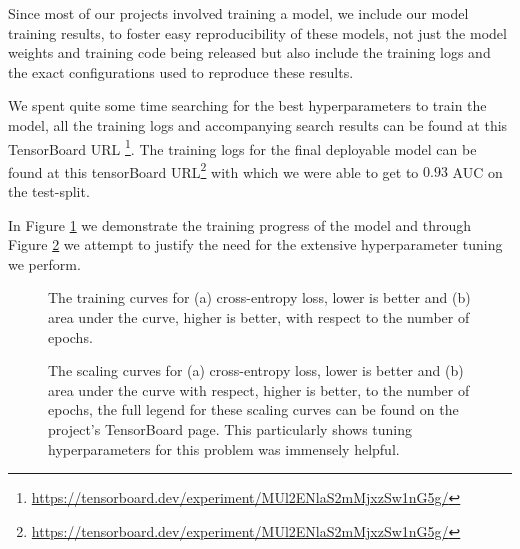 \documentclass[fontsize=11pt]{article}
\begin{document}
Since most of our projects involved training a model, we include our model training results, to foster easy reproducibility of these models, not just the model weights and training code being released but also include the training logs and the exact configurations used to reproduce these results.

We spent quite some time searching for the best hyperparameters to train the model, all the training logs and accompanying search results can be found at 
 this TensorBoard URL \footnote{\url{https://tensorboard.dev/experiment/MUl2ENlaS2mMjxzSw1nG5g/}}. The training logs for the final deployable model can be found at this tensorBoard URL\footnote{\url{https://tensorboard.dev/experiment/MUl2ENlaS2mMjxzSw1nG5g/}} with which we were able to get to $0.93$ AUC on the test-split.

In Figure \ref{fig:training_logs} we demonstrate the training progress of the model and through Figure \ref{fig:scaling_logs} we attempt to justify the need for the extensive hyperparameter tuning we perform.

\begin{figure}[htbp]
  \centering
  \begin{minipage}{0.45\textwidth}
    \centering
    
    \subcaption{}
    \label{fig:sub_a}
  \end{minipage}\hfill
  \begin{minipage}{0.45\textwidth}
    \centering
    
    \subcaption{}
    \label{fig:sub_b}
  \end{minipage}
  \caption{The training curves for (a) cross-entropy loss, lower is better and (b) area under the curve, higher is better, with respect to the number of epochs.}
  \label{fig:training_logs}
\end{figure}

\begin{figure}[htbp]
  \centering
  \begin{minipage}{0.45\textwidth}
    \centering
    
    \subcaption{}
    \label{fig:sub_a}
  \end{minipage}\hfill
  \begin{minipage}{0.45\textwidth}
    \centering
    
    \subcaption{}
    \label{fig:sub_b}
  \end{minipage}
  \caption{The scaling curves for (a) cross-entropy loss, lower is better and (b) area under the curve with respect, higher is better, to the number of epochs, the full legend for these scaling curves can be found on the project's TensorBoard page. This particularly shows tuning hyperparameters for this problem was immensely helpful.}
  \label{fig:scaling_logs}
\end{figure}
\end{document}
